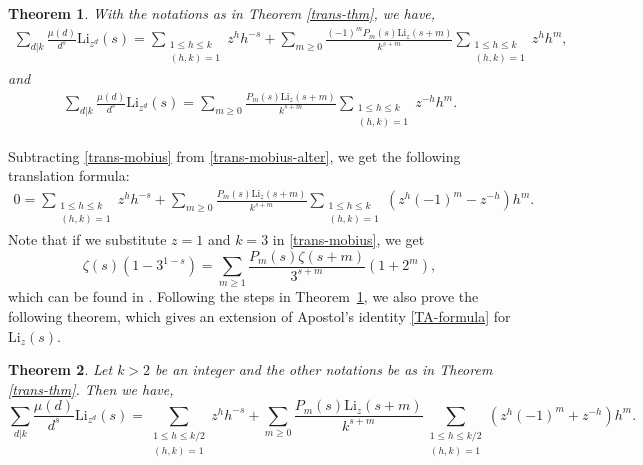 \documentclass[12pt]{amsart}
\newtheorem{thm}{Theorem}
\newcommand{\thmref}[1]{Theorem~\ref{#1}}
\begin{document}
\begin{thm}\label{thm-trans-mobius}
With the notations as in Theorem \ref{trans-thm}, we have,
\begin{align}\label{trans-mobius-alter}
 \sum_{d|k}\frac{\mu(d)}{d^s}\mathrm{Li}_{z^d}(s)=\sum_{ \substack{1\leq h\leq k \\(h,k)=1}}z^hh^{-s}
 +\sum_{m\geq0}\frac{(-1)^mP_m(s)\mathrm{Li}_z(s+m)}{k^{s+m}}\sum_{\substack{1\leq h\leq k \\(h,k)=1}}z^{h}h^m,
\end{align}
and
\begin{align}\label{trans-mobius}
 \sum_{d|k}\frac{\mu(d)}{d^s}\mathrm{Li}_{z^d}(s)=\sum_{m\geq0}\frac{P_m(s)\mathrm{Li}_z(s+m)}{k^{s+m}}\sum_{\substack{1\leq h\leq k \\(h,k)=1}}z^{-h}h^m.
 \end{align}
\end{thm}

Subtracting \eqref{trans-mobius} from \eqref{trans-mobius-alter}, we get the following translation formula:
\begin{align}\label{trans-mobius-sub}
 0=\sum_{ \substack{1\leq h\leq k \\(h,k)=1}}z^hh^{-s}
 +\sum_{m\geq0}\frac{P_m(s)\mathrm{Li}_z(s+m)}{k^{s+m}}\sum_{\substack{1\leq h\leq k \\(h,k)=1}}\left(z^{h}(-1)^m-z^{-h}\right)h^m.
\end{align}
Note that if we substitute $z=1$ and $k=3$ in \eqref{trans-mobius}, we get
$$
\zeta(s)(1-3^{1-s})=\sum_{m\geq1}\frac{P_{m}(s)\zeta(s+m)}{3^{s+m}}(1+2^m),
$$
which can be found in \cite[(2.16)]{LOC}.
Following the steps in \thmref{thm-trans-mobius}, we also prove the following theorem, which gives an extension
of Apostol's identity \eqref{TA-formula} for $\mathrm{Li}_z(s)$. 

\begin{thm}\label{TA-thm-2} 
Let $k>2$ be an integer and the other notations be as in Theorem \ref{trans-thm}. Then we have,
 \begin{equation}\label{TA-type-1}
 \sum_{d|k}\frac{\mu(d)}{d^s}\mathrm{Li}_{z^d}(s)=\sum_{ \substack{1\leq h\leq k/2 \\(h,k)=1}}z^hh^{-s}
 +\sum_{m\geq0}\frac{P_m(s)\mathrm{Li}_z(s+m)}{k^{s+m}}\sum_{\substack{1\leq h\leq k/2 \\(h,k)=1}}\left(z^{h}(-1)^m+z^{-h}\right)h^m.
 \end{equation}
 \end{thm}
 
\end{document}
